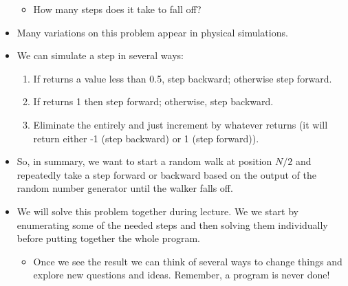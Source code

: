 \documentclass[letterpaper,10pt,english]{sphinxmanual}
\begin{document}
\begin{itemize}
\begin{itemize}
\begin{itemize}
\end{itemize}

\item {} 
How many steps does it take to fall off?

\end{itemize}

\item {} 
Many variations on this problem appear in physical simulations.

\item {} 
We can simulate a step in several ways:
\begin{enumerate}
\def\theenumi{\arabic{enumi}}
\def\labelenumi{\theenumi .}
\makeatletter\def\p@enumii{\p@enumi \theenumi .}\makeatother
\item {} 
If  returns a value less than 0.5, step backward;
otherwise step forward.

\item {} 
If  returns 1 then step forward; otherwise,
step backward.

\item {} 
Eliminate the  entirely and just increment by whatever 
returns (it will return either -1 (step backward) or 1 (step forward)).

\end{enumerate}

\item {} 
So, in summary, we want to start a random walk at position \(N/2\) and
repeatedly take a step forward or backward based on the
output of the random number generator until the walker falls off.

\item {} 
We will solve this problem together during lecture.
We we start by enumerating some of the needed steps and then
solving them individually before putting together the whole
program.
\begin{itemize}
\item {} 
Once we see the result we can think of several ways to change
things and explore new questions and ideas. Remember, a program
is never done!

\end{itemize}

\end{itemize}
\end{document}
